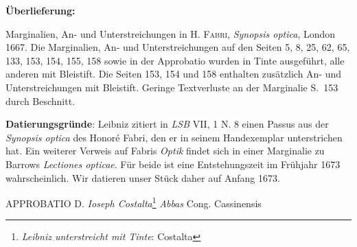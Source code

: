       
               
                \begin{ledgroupsized}[r]{120mm}
                \footnotesize 
                \pstart                
                \noindent\textbf{\"{U}berlieferung:}   
                \pend
                \end{ledgroupsized}
            
              
                            \begin{ledgroupsized}[r]{114mm}
                            \footnotesize 
                            \pstart \parindent -6mm
                            Marginalien, An- und Unterstreichungen in \textsc{H. Fabri}, \cite{00147}\textit{Synopsis optica}, London 1667. Die Marginalien, An- und Unterstreichungen auf den Seiten 5, 8, 25, 62, 65, 133, 153, 154, 155, 158 sowie in der Approbatio wurden in Tinte ausgef\"{u}hrt, alle anderen mit Bleistift. Die Seiten 153, 154 und 158 enthalten zus\"{a}tzlich An- und Unterstreichungen mit Bleistift. Geringe Textverluste an der Marginalie S.~153 durch Beschnitt.\pend
                            \end{ledgroupsized}
                \vspace*{5mm}
                \begin{ledgroup}
                \footnotesize 
                \pstart
            \noindent\footnotesize{\textbf{Datierungsgr\"{u}nde}: Leibniz zitiert in \textit{LSB} VII, 1 N. 8 einen Passus aus der \cite{00147}\textit{Synopsis optica} des Honor\'{e} Fabri, den er in seinem Handexemplar unterstrichen hat. Ein weiterer Verweis auf Fabris \cite{00147}\textit{Optik} findet sich in einer Marginalie zu Barrows \cite{00144}\textit{Lectiones opticae}. F\"{u}r beide ist eine Entstehungszeit im Fr\"{u}hjahr 1673 wahrscheinlich. Wir datieren unser St\"{u}ck daher auf Anfang 1673.}
                \pend
                \end{ledgroup}
            
                \vspace*{8mm}
                \pstart 
                \normalsize
            \centering APPROBATIO \pend \vspace{1.0ex} \pstart D. \textit{Ioseph Costalta}\protect{}\footnote{\textit{Leibniz unterstreicht mit Tinte}: Costalta}\textit{ Abbas} Cong. Cassinensis